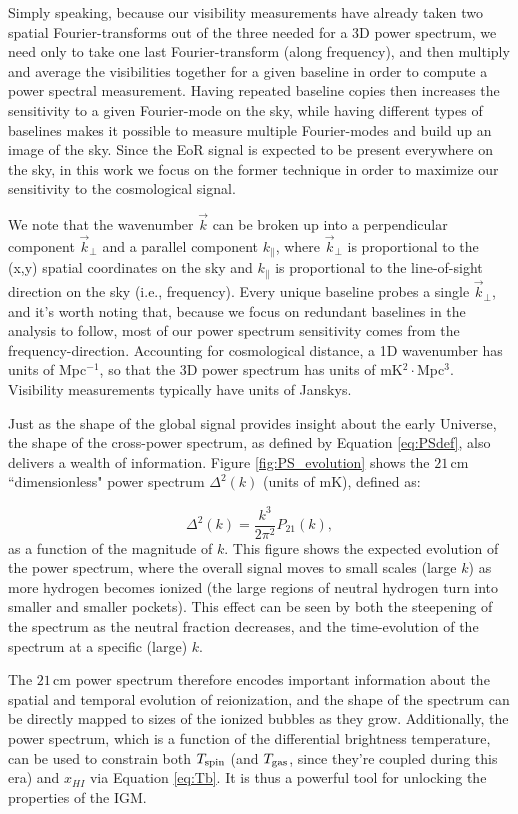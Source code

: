 Simply speaking, because our visibility measurements have already taken two spatial Fourier-transforms out of the three needed for a 3D power spectrum, we need only to take one last Fourier-transform (along frequency), and then multiply and average the visibilities together for a given baseline in order to compute a power spectral measurement. Having repeated baseline copies then increases the sensitivity to a given Fourier-mode on the sky, while having different types of baselines makes it possible to measure multiple Fourier-modes and build up an image of the sky. Since the EoR signal is expected to be present everywhere on the sky, in this work we focus on the former technique in order to maximize our sensitivity to the cosmological signal.

We note that the wavenumber $\vec{k}$ can be broken up into a perpendicular component $\vec{k}_{\perp}$ and a parallel component $k_{\parallel}$, where $\vec{k}_{\perp}$ is proportional to the (x,y) spatial coordinates on the sky and $k_{\parallel}$ is proportional to the line-of-sight direction on the sky (i.e., frequency). Every unique baseline probes a single $\vec{k}_{\perp}$, and it's worth noting that, because we focus on redundant baselines in the analysis to follow, most of our power spectrum sensitivity comes from the frequency-direction. Accounting for cosmological distance, a 1D wavenumber has units of Mpc$^{-1}$, so that the 3D power spectrum has units of mK$^{2}\cdot$Mpc$^{3}$. Visibility measurements typically have units of Janskys.

Just as the shape of the global signal provides insight about the early Universe, the shape of the cross-power spectrum, as defined by Equation \eqref{eq:PSdef}, also delivers a wealth of information. Figure \ref{fig:PS_evolution} shows the $21$\,cm ``dimensionless" power spectrum $\Delta^{2}(k)$ (units of mK), defined as:

\begin{equation}
\Delta^{2}(k) = \frac{k^{3}}{2\pi^{2}}P_{21}(k),
\end{equation}
as a function of the magnitude of $k$. This figure shows the expected evolution of the power spectrum, where the overall signal moves to small scales (large $k$) as more hydrogen becomes ionized (the large regions of neutral hydrogen turn into smaller and smaller pockets). This effect can be seen by both the steepening of the spectrum as the neutral fraction decreases, and the time-evolution of the spectrum at a specific (large) $k$.

The $21$\,cm power spectrum therefore encodes important information about the spatial and temporal evolution of reionization, and the shape of the spectrum can be directly mapped to sizes of the ionized bubbles as they grow. Additionally, the power spectrum, which is a function of the differential brightness temperature, can be used to constrain both $T_{\rm spin}$ (and $T_{\rm gas}$, since they're coupled during this era) and $x_{HI}$ via Equation \eqref{eq:Tb}. It is thus a powerful tool for unlocking the properties of the IGM.

